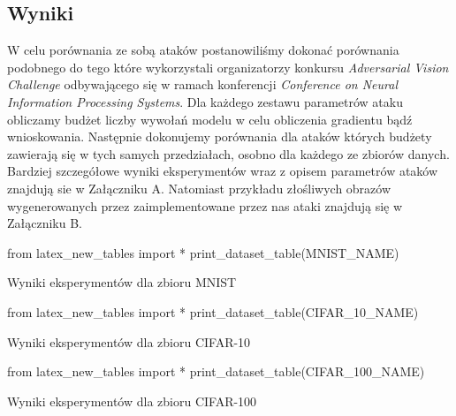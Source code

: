 \documentclass[
    left=2.5cm,         %
    right=2.5cm,        %
    top=2.5cm,          %
    bottom=3cm,         %
    bindingoffset=6mm,  %
    nohyphenation=false %
]{eiti/eiti-thesis}
\begin{document}
\subsection{Wyniki}
W celu porównania ze sobą ataków postanowiliśmy dokonać porównania podobnego do tego które wykorzystali organizatorzy konkursu
\textit{Adversarial Vision Challenge}\cite{DBLP:journals/corr/abs-1808-01976} odbywającego się w ramach konferencji \textit{Conference on Neural Information Processing Systems}.
Dla każdego zestawu parametrów ataku obliczamy budżet liczby wywołań modelu w celu obliczenia gradientu bądź wnioskowania.
Następnie dokonujemy porównania dla ataków których budżety zawierają się w tych samych przedziałach, osobno dla każdego ze zbiorów danych.
Bardziej szczegółowe wyniki eksperymentów wraz z opisem parametrów ataków znajdują sie w Załączniku A.
Natomiast przykładu złośliwych obrazów wygenerowanych przez zaimplementowane przez nas ataki znajdują się w Załączniku B.

\begin{table}[H]
\begin{adjustbox}{max width=\textwidth}
\begin{pycode}
from latex_new_tables import *
print_dataset_table(MNIST_NAME)
\end{pycode}
\end{adjustbox}
\caption{Wyniki eksperymentów dla zbioru MNIST}
\end{table}

\begin{table}[H]
\begin{adjustbox}{max width=\textwidth}
\begin{pycode}
from latex_new_tables import *
print_dataset_table(CIFAR_10_NAME)
\end{pycode}
\end{adjustbox}
\caption{Wyniki eksperymentów dla zbioru CIFAR-10}
\end{table}

\begin{table}[H]
\begin{adjustbox}{max width=\textwidth}
\begin{pycode}
from latex_new_tables import *
print_dataset_table(CIFAR_100_NAME)
\end{pycode}
\end{adjustbox}
\caption{Wyniki eksperymentów dla zbioru CIFAR-100}
\end{table}
\end{document}
